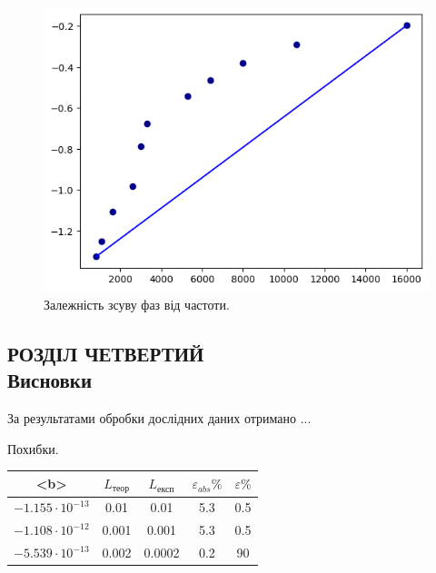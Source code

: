 \documentclass[a4paper,12pt]{article}
\begin{document}
\newpage
    \begin{figure}[h!]
		\centering
		\begin{minipage}[h]{1\linewidth}
			\includegraphics[width=0.8\linewidth]{Prt sc/Figure_3.png}
			\caption{Залежність зсуву фаз від частоти.}
			\label{Figure_3}
		\end{minipage}
	\end{figure}


\newpage
	\begin{center}
		\section* {РОЗДІЛ ЧЕТВЕРТИЙ\\Висновки}
	\end{center}
    За результатами обробки дослідних даних отримано ...

    \begin{center}
		Похибки.
	\end{center}

    \begin{table}[h!]
        \centering
        \begin{tabular}{|c|c|c|c|c|}
            \hline
            \textbf{<b>} & \textbf{$L_{\textrm{теор}}$} & \textbf{$L_{\textrm{експ}}$} & \textbf{$\varepsilon_{abs}\%$} & \textbf{$\varepsilon\%$} \\ \hline
            $-1.155\cdot10^{-13}$               & 0.01                & 0.01                & 5.3                            & 0.5                      \\ \hline
            $-1.108\cdot10^{-12}$               & 0.001               & 0.001               & 5.3                            & 0.5                      \\ \hline
            $-5.539\cdot10^{-13}$               & 0.002               & 0.0002              & 0.2                            & 90                       \\ \hline
        \end{tabular}
    \end{table}
    
\end{document}
